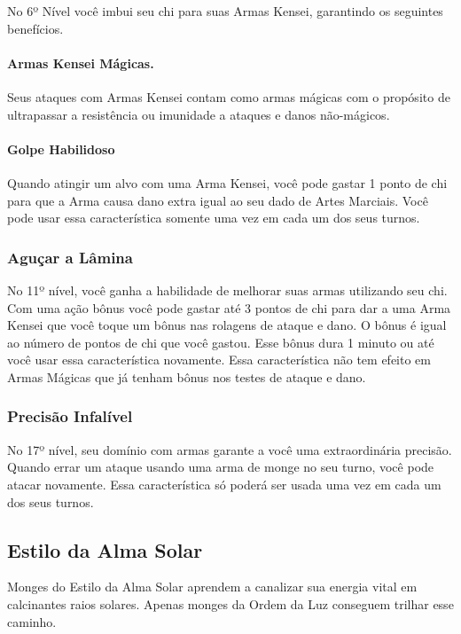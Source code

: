 \begin{multicols}{2}
No 6º Nível você imbui seu chi para suas Armas Kensei, garantindo os seguintes
benefícios.

\paragraph{Armas Kensei Mágicas.}%
Seus ataques com Armas Kensei contam como armas mágicas com o propósito de
ultrapassar a resistência ou imunidade a ataques e danos não-mágicos.

\paragraph{Golpe Habilidoso}%
Quando atingir um alvo com uma Arma Kensei, você pode gastar 1 ponto de chi para
que a Arma causa dano extra igual ao seu dado de Artes Marciais. Você pode usar
essa característica somente uma vez em cada um dos seus turnos.

\subsubsection*{Aguçar a Lâmina}%
\label{ssub:agucar_a_lamina}

No 11º nível, você ganha a habilidade de melhorar suas armas utilizando seu chi.
Com uma ação bônus você pode gastar até 3 pontos de chi para dar a uma Arma
Kensei que você toque um bônus nas rolagens de ataque e dano. O bônus é igual
ao número de pontos de chi que você gastou. Esse bônus dura 1 minuto ou até você
usar essa característica novamente. Essa característica não tem efeito em Armas
Mágicas que já tenham bônus nos testes de ataque e dano.

\subsubsection*{Precisão Infalível}%
\label{ssub:precisao_infalivel}

No 17º nível, seu domínio com armas garante a você uma extraordinária precisão.
Quando errar um ataque usando uma arma de monge no seu turno, você pode atacar
novamente. Essa característica só poderá ser usada uma vez em cada um dos seus
turnos.

\subsection*{Estilo da Alma Solar}%
\label{sub:estilo_da_alma_solar}

Monges do Estilo da Alma Solar aprendem a canalizar sua energia vital em
calcinantes raios solares. Apenas monges da Ordem da Luz conseguem trilhar esse
caminho.


\end{multicols}
